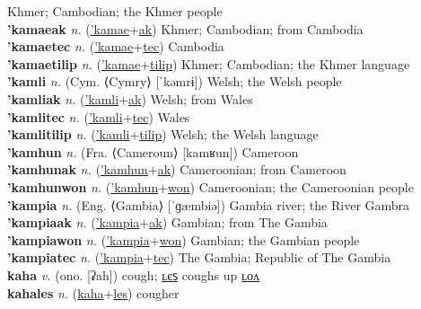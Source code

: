 Khmer; Cambodian; the Khmer people \label{'kamae} \\
\textbf{'kamaeak} \textit{n.} (\hyperref['kamae]{'kamae}+\hyperref[ak]{ak})
Khmer; Cambodian; from Cambodia \label{'kamaeak} \\
\textbf{'kamaetec} \textit{n.} (\hyperref['kamae]{'kamae}+\hyperref[tec]{tec})
Cambodia \label{'kamaetec} \\
\textbf{'kamaetilip} \textit{n.} (\hyperref['kamae]{'kamae}+\hyperref[tilip]{tilip})
Khmer; Cambodian; the Khmer language \label{'kamaetilip} \\
\textbf{'kamli} \textit{n.} (Cym. ⟨Cymry⟩ [ˈkəmrɨ])
Welsh; the Welsh people \label{'kamli} \\
\textbf{'kamliak} \textit{n.} (\hyperref['kamli]{'kamli}+\hyperref[ak]{ak})
Welsh; from Wales \label{'kamliak} \\
\textbf{'kamlitec} \textit{n.} (\hyperref['kamli]{'kamli}+\hyperref[tec]{tec})
Wales \label{'kamlitec} \\
\textbf{'kamlitilip} \textit{n.} (\hyperref['kamli]{'kamli}+\hyperref[tilip]{tilip})
Welsh; the Welsh language \label{'kamlitilip} \\
\textbf{'kamhun} \textit{n.} (Fra. ⟨Cameroun⟩ [kamʁun])
Cameroon \label{'kamhun} \\
\textbf{'kamhunak} \textit{n.} (\hyperref['kamhun]{'kamhun}+\hyperref[ak]{ak})
Cameroonian; from Cameroon \label{'kamhunak} \\
\textbf{'kamhunwon} \textit{n.} (\hyperref['kamhun]{'kamhun}+\hyperref[won]{won})
Cameroonian; the Cameroonian people \label{'kamhunwon} \\
\textbf{'kampia} \textit{n.} (Eng. ⟨Gambia⟩ [ˈɡæmbiə])
Gambia river; the River Gambra \label{'kampia} \\
\textbf{'kampiaak} \textit{n.} (\hyperref['kampia]{'kampia}+\hyperref[ak]{ak})
Gambian; from The Gambia \label{'kampiaak} \\
\textbf{'kampiawon} \textit{n.} (\hyperref['kampia]{'kampia}+\hyperref[won]{won})
Gambian; the Gambian people \label{'kampiawon} \\
\textbf{'kampiatec} \textit{n.} (\hyperref['kampia]{'kampia}+\hyperref[tec]{tec})
The Gambia; Republic of The Gambia \label{'kampiatec} \\
\textbf{kaha} \textit{v.} (ono. [ʡah])
cough; \hyperref[kahales]{ʟєꜱ} coughs up \hyperref[kahalon]{ʟᴏᴧ} \label{kaha} \\
\textbf{kahales} \textit{n.} (\hyperref[kaha]{kaha}+\hyperref[les]{les})
cougher \label{kahales} \\
